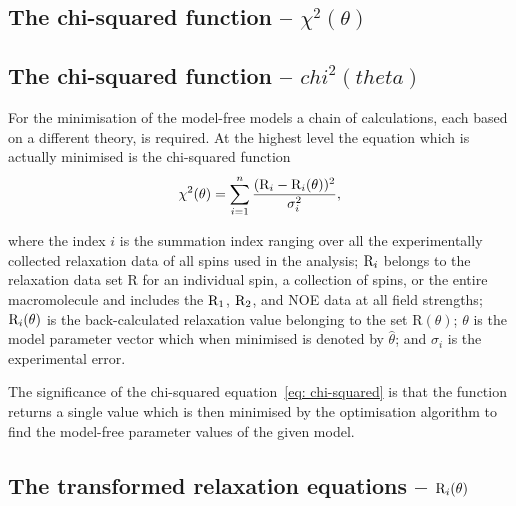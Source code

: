 \begin{latexonly}
    \subsection{The chi-squared function -- $\chi^2(\theta)$}
\end{latexonly}
\begin{htmlonly}
    \subsection{The chi-squared function -- $chi^2(theta)$}
\begin{htmlonly}


For the minimisation of the model-free models a chain of calculations, each based on a different theory, is required.
At the highest level the equation which is actually minimised is the chi-squared function
\begin{equation} \label{eq: chi-squared}
 \chi^2(\theta) = \sum_{i=1}^n \frac{(\mathrm{R}_i - \mathrm{R}_i(\theta))^2}{\sigma_i^2},
\end{equation}

\noindent where the index $i$ is the summation index ranging over all the experimentally collected relaxation data of all spins used in the analysis; $\mathrm{R}_i$ belongs to the relaxation data set R for an individual spin, a collection of spins, or the entire macromolecule and includes the $\mathrm{R}_1$, $\mathrm{R}_2$, and NOE data at all field strengths; $\mathrm{R}_i(\theta)$ is the back-calculated relaxation value belonging to the set R$(\theta)$; $\theta$ is the model parameter vector which when minimised is denoted by $\hat\theta$; and $\sigma_i$ is the experimental error.

The significance of the chi-squared equation~\eqref{eq: chi-squared} is that the function returns a single value which is then minimised by the optimisation algorithm to find the model-free parameter values of the given model.



\begin{latexonly}
    \subsection{The transformed relaxation equations -- $\mathrm{R}_i(\theta)$}
\end{latexonly}
\begin{htmlonly}

\end{htmlonly}
\end{htmlonly}
\end{htmlonly}
